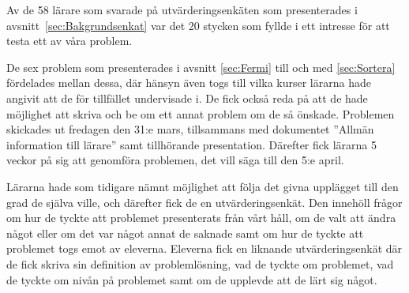 \textcolor{lila}{Av de 58 lärare som svarade på utvärderingsenkäten som presenterades i avsnitt~\ref{sec:Bakgrundsenkat} var det 20 stycken som fyllde i ett intresse för att testa ett av våra problem.} 

\textcolor{lila}{De sex problem som presenterades i avsnitt \ref{sec:Fermi} till och med \ref{sec:Sortera} fördelades mellan dessa, där hänsyn även togs till vilka kurser lärarna hade angivit att de för tillfället undervisade i. De fick också reda på att de hade möjlighet att skriva och be om ett annat problem om de så önskade. Problemen skickades ut fredagen den 31:e mars, tillsammans med dokumentet ''Allmän information till lärare'' samt tillhörande presentation. Därefter fick lärarna 5 veckor på sig att genomföra problemen, det vill säga till den 5:e april.} 

\textcolor{lila}{Lärarna hade som tidigare nämnt möjlighet att följa det givna upplägget till den grad de själva ville, och därefter fick de en utvärderingsenkät. Den innehöll frågor om hur de tyckte att problemet presenterats från vårt håll, om de valt att ändra något eller om det var något annat de saknade samt om hur de tyckte att problemet togs emot av eleverna. Eleverna fick en liknande utvärderingsenkät där de fick skriva sin definition av problemlösning, vad de tyckte om problemet, vad de tyckte om nivån på problemet samt om de upplevde att de lärt sig något.}